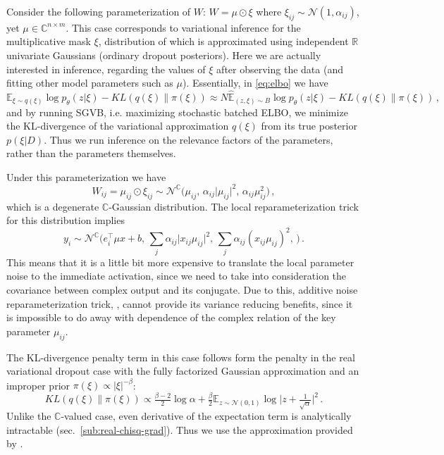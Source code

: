 \documentclass[a4paper,10pt]{article}
\newcommand{\real}{\mathbb{R}}
\newcommand{\cplx}{\mathbb{C}}
\begin{document}
Consider the following parameterization of $W$: $
  W = \mu \odot \xi
$ where $
  \xi_{ij} \sim \mathcal{N}(1, \alpha_{ij})
$, yet $\mu \in \cplx^{n \times m}$. This case corresponds to variational inference for the
multiplicative mask $\xi$, distribution of which is approximated using independent $\real$
univariate Gaussians (ordinary dropout posteriors). Here we are actually interested in
inference, regarding the values of $\xi$ after observing the data (and fitting other model
parameters such as $\mu$). Essentially, in \eqref{eq:elbo} we have
$$
\mathbb{E}_{\xi \sim q(\xi)}
  \log p_\theta(z \vert \xi)
  - KL(q(\xi) \| \pi(\xi))
  \approx
    N \hat{\mathbb{E}}_{(z, \xi) \sim B}
      \log p_\theta(z \vert \xi)
    - KL(q(\xi) \| \pi(\xi))
  \,, $$
and by running SGVB, i.e. maximizing stochastic batched ELBO, we minimize the KL-divergence
of the variational approximation $q(\xi)$ from its true posterior $p(\xi\vert D)$. Thus we
run inference on the relevance factors of the parameters, rather than the parameters themselves.

Under this parameterization we have
$$
W_{ij} = \mu_{ij} \odot \xi_{ij}
  \sim \mathcal{N}^{\cplx} \bigl(
    \mu_{ij},
    \, \alpha_{ij} \lvert \mu_{ij} \rvert^2,
    \, \alpha_{ij} \mu_{ij}^2
  \bigr)
  \,, $$
which is a degenerate $\cplx$-Gaussian distribution. The local reparameterization trick for
this distribution implies
$$
y_i
  \sim \mathcal{N}^{\cplx}\bigl(
    e_i^\top \mu x + b,
    \, \sum_j \alpha_{ij} \lvert x_{ij} \mu_{ij}\rvert^2,
    \, \sum_j \alpha_{ij} (x_{ij} \mu_{ij})^2,
    \,
  \bigr)
  \,. $$
This means that it is a little bit more expensive to translate the local parameter noise
to the immediate activation, since we need to take into consideration the covariance between
complex output and its conjugate. Due to this, additive noise reparameterization trick,
\cite{molchanov_variational_2017}, cannot provide its variance reducing benefits, since
it is impossible to do away with dependence of the complex relation of the key parameter
$\mu_{ij}$.

The KL-divergence penalty term in this case follows form the penalty in the real variational
dropout case with the fully factorized Gaussian approximation and an improper prior $
  \pi(\xi)\propto \lvert \xi \rvert^{-\beta}
$:
$$
KL(q(\xi)\| \pi(\xi))
  \propto \tfrac{\beta-2}2 \log \alpha
    + \tfrac\beta2 \mathbb{E}_{z\sim \mathcal{N}(0, 1)}
      \log \lvert z + \tfrac1{\sqrt{\alpha}} \rvert^2
  \,. $$
Unlike the $\cplx$-valued case, even derivative of the expectation term is analytically
intractable (sec.~\ref{sub:real-chisq-grad}). Thus we use the approximation provided
by \cite{molchanov_variational_2017}.
\end{document}
